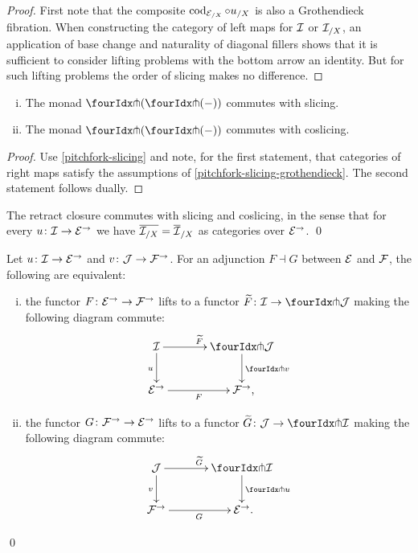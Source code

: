 \documentclass[reqno,10pt,a4paper,oneside,draft]{amsart}
\begin{document}
{{\begin{proof}
First note that the composite $\cod_{\cal{E}_{/X}} \cc u_{/X}$ is also a Grothendieck fibration.
When constructing the category of left maps for $\cal{I}$ or $\cal{I}_{/X}$, an application of base change and naturality of diagonal fillers shows that it is sufficient to consider lifting problems with the bottom arrow an identity.
But for such lifting problems the order of slicing makes no difference.
\end{proof}

\begin{corollary} \label{pitchfork-slicing-monad} \leavevmode
\begin{enumerate}[(i)]
\item The monad $\liftl{(\liftr{(-)})}$ commutes with slicing.
\item The monad $\liftr{(\liftl{(-)})}$ commutes with coslicing.
\end{enumerate}
\end{corollary}

\begin{proof}
Use \cref{pitchfork-slicing} and note, for the first statement, that categories of right maps satisfy the assumptions of \cref{pitchfork-slicing-grothendieck}.
The second statement follows dually.
\end{proof}

\begin{proposition}
The retract closure commutes with slicing and coslicing, in the sense that for every $u \co \cal{I} \to \catE^\to$ we have $\overline{\cal{I}_{/X}} = \overline{\cal{I}}_{/X}$ as categories over $\catE^\to$.
\qed
\end{proposition}

\begin{proposition} \label{lift-of-adjunction}
Let $u \co \cal{I} \to \catE^\to$ and $v \co \cal{J} \to \cal{F}^\to$.
For an adjunction $F \dashv G$ between $\cal{E}$ and $\cal{F}$, the following are equivalent:
\begin{enumerate}[(i)]
\item the functor $F \co \catE^\to \to \cal{F}^\to$ lifts to a functor $\widetilde{F} \co \cal{I} \to \liftl{\cal{J}}$ making the following diagram commute:
\[
\xymatrix@C=1.2cm{
  \cal{I}
  \ar[r]^{\widetilde{F}}
  \ar[d]_{u}
&
  \liftl{\cal{J}}
  \ar[d]^{\liftl{v}}
\\
  \catE^\to
  \ar[r]_-{F}
&
  \cal{F}^\to
\rlap{,}}
\]
\item the functor $G \co \cal{F}^\to \to \catE^\to$ lifts to a functor $\widetilde{G} \co \cal{J} \to \liftr{\cal{I}}$ making the following diagram commute:
\[
\xymatrix@C=1.2cm{
  \cal{J}
  \ar[d]_{v}
  \ar[r]^{\widetilde{G}}
&
  \liftr{\cal{I}}
  \ar[d]^{\liftr{u}}
\\
  \cal{F}^\to
  \ar[r]_{G}
&
  \catE^\to
\rlap{.}  }
\]
\end{enumerate}
\qed
\end{proposition}

}}
\end{document}
